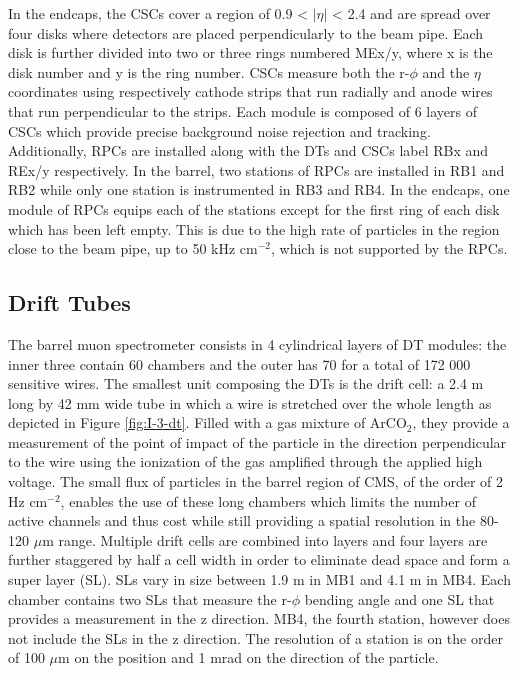     In the endcaps, the CSCs cover a region of 0.9 < $ | \eta | $ < 2.4 and are spread over four disks where detectors are placed perpendicularly to the beam pipe. Each disk is further divided into two or three rings numbered MEx/y, where x is the disk number and y is the ring number. CSCs measure both the r-$\phi$ and the $ \eta $ coordinates using respectively cathode strips that run radially and anode wires that run perpendicular to the strips. Each module is composed of 6 layers of CSCs which provide precise background noise rejection and tracking. \\

    Additionally, RPCs are installed along with the DTs and CSCs label RBx and REx/y respectively. In the barrel, two stations of RPCs are installed in RB1 and RB2 while only one station is instrumented in RB3 and RB4. In the endcaps, one module of RPCs equips each of the stations except for the first ring of each disk which has been left empty. This is due to the high rate of particles in the region close to the beam pipe, up to 50 kHz cm$^{-2}$, which is not supported by the RPCs.

    \subsection{Drift Tubes}

      The barrel muon spectrometer consists in 4 cylindrical layers of DT modules: the inner three contain 60 chambers and the outer has 70 for a total of 172 000 sensitive wires. The smallest unit composing the DTs is the drift cell: a 2.4 m long by 42 mm wide tube in which a wire is stretched over the whole length as depicted in Figure \ref{fig:I-3-dt}. Filled with a gas mixture of ArCO$_2$, they provide a measurement of the point of impact of the particle in the direction perpendicular to the wire using the ionization of the gas amplified through the applied high voltage. The small flux of particles in the barrel region of CMS, of the order of 2 Hz cm$^{-2}$, enables the use of these long chambers which limits the number of active channels and thus cost while still providing a spatial resolution in the 80-120 $\mu$m range. Multiple drift cells are combined into layers and four layers are further staggered by half a cell width in order to eliminate dead space and form a super layer (SL). SLs vary in size between 1.9 m in MB1 and 4.1 m in MB4. Each chamber contains two SLs that measure the r-$\phi$ bending angle and one SL that provides a measurement in the z direction. MB4, the fourth station, however does not include the SLs in the z direction. The resolution of a station is on the order of 100 $\mu$m on the position and 1 mrad on the direction of the particle. \\

